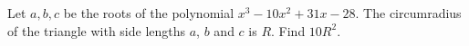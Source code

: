 Let $a, b, c$ be the roots of the polynomial $x^3 - 10x^2 + 31x - 28$. The circumradius of the triangle with side lengths $a$, $b$ and $c$ is $R$. Find $10R^2$.
